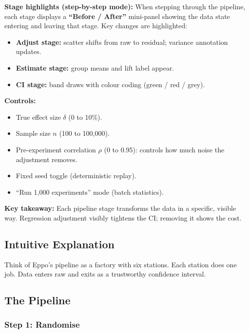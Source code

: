 \documentclass[12pt, a4paper]{article}
\begin{document}
\begin{simulation}
\textbf{Stage highlights (step-by-step mode):}
When stepping through the pipeline, each stage displays a
\textbf{``Before / After''} mini-panel showing the data state entering and
leaving that stage.  Key changes are highlighted:
\begin{itemize}[nosep]
  \item \textbf{Adjust stage:} scatter shifts from raw to residual; variance
        annotation updates.
  \item \textbf{Estimate stage:} group means and lift label appear.
  \item \textbf{CI stage:} band draws with colour coding (green / red / grey).
\end{itemize}

\textbf{Controls:}
\begin{itemize}[nosep]
  \item True effect size $\delta$ (0 to 10\%).
  \item Sample size $n$ (100 to 100,000).
  \item Pre-experiment correlation $\rho$ (0 to 0.95): controls how much
        noise the adjustment removes.
  \item Fixed seed toggle (deterministic replay).
  \item ``Run 1,000 experiments'' mode (batch statistics).
\end{itemize}

\textbf{Key takeaway:}
Each pipeline stage transforms the data in a specific, visible way.
Regression adjustment visibly tightens the CI; removing it shows the cost.
\end{simulation}

\subsection{Intuitive Explanation}

\begin{intuition}
Think of Eppo's pipeline as a factory with six stations.  Each station does
one job.  Data enters raw and exits as a trustworthy confidence interval.
\end{intuition}

\subsection{The Pipeline}

\subsubsection*{Step 1: Randomise}
\end{document}
